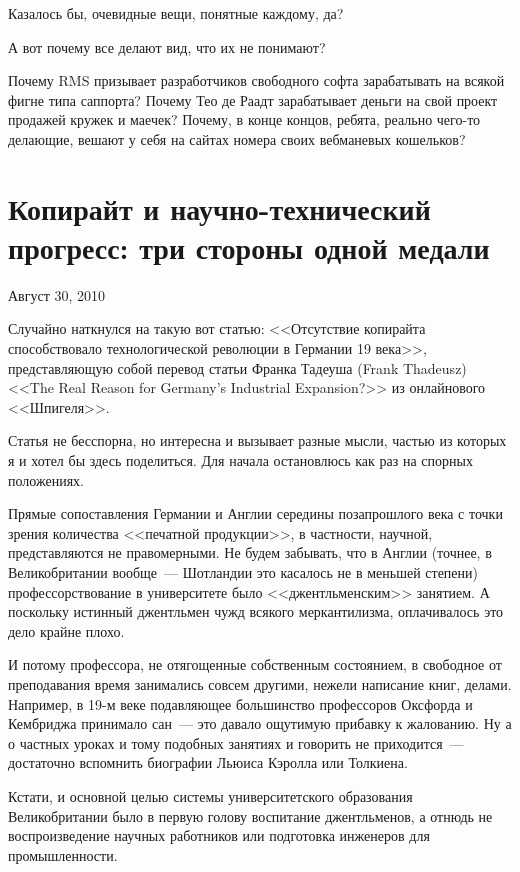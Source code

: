 Казалось бы, очевидные вещи, понятные каждому, да?

А вот почему все делают вид, что их не понимают?

Почему RMS призывает разработчиков свободного софта зарабатывать на всякой фигне типа саппорта?  Почему Тео де Раадт зарабатывает деньги на свой проект продажей кружек и маечек? Почему, в конце концов, ребята, реально чего-то делающие, вешают у себя на сайтах номера своих вебманевых кошельков?

\section{Копирайт и научно-технический прогресс: три стороны одной медали}
\begin{timeline}Август 30, 2010\end{timeline}
Случайно наткнулся на такую вот статью: <<Отсутствие копирайта способствовало технологической революции в Германии 19 века>>, представляющую собой перевод статьи Франка Тадеуша (Frank Thadeusz) <<The Real Reason for Germany's Industrial Expansion?>> из онлайнового <<Шпигеля>>.

Статья не бесспорна, но интересна и вызывает разные мысли, частью из которых я и хотел бы здесь поделиться. Для начала остановлюсь как раз на спорных положениях.

Прямые сопоставления Германии и Англии середины позапрошлого века с точки зрения количества <<печатной продукции>>, в частности, научной, представляются не правомерными. Не будем забывать, что в Англии (точнее, в Великобритании вообще~--- Шотландии это касалось не в меньшей степени) профессорствование в университете было <<джентльменским>> занятием. А поскольку истинный джентльмен чужд всякого меркантилизма, оплачивалось это дело крайне плохо.

И потому профессора, не отягощенные собственным  состоянием, в свободное от преподавания время занимались совсем другими, нежели написание книг, делами. Например, в 19-м веке подавляющее большинство профессоров Оксфорда и Кембриджа принимало сан~--- это давало ощутимую прибавку к жалованию. Ну а о частных уроках и тому подобных занятиях и говорить не приходится~--- достаточно вспомнить биографии Льюиса Кэролла или Толкиена.

Кстати, и основной целью системы университетского образования Великобритании было в первую голову воспитание джентльменов, а отнюдь не воспроизведение научных работников или подготовка инженеров для промышленности.

